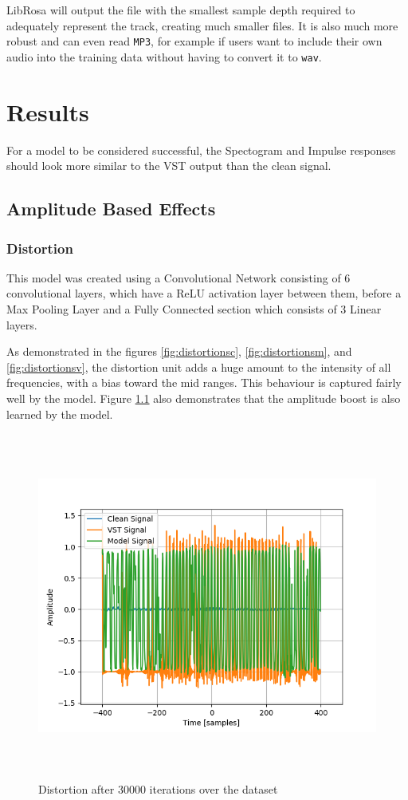 \documentclass{l4proj}
\begin{document}
LibRosa will output the file with the smallest sample depth required to
adequately represent the track, creating much smaller files. It is also
much more robust and can even read \texttt{MP3}, for example if users
want to include their own audio into the training data without having to
convert it to \texttt{wav}.

\chapter{Results}\label{results}

For a model to be considered successful, the Spectogram and Impulse
responses should look more similar to the VST output than the clean
signal.

\section{Amplitude Based Effects}\label{amplitude-based-effects}

\subsection{Distortion}\label{distortion}

This model was created using a Convolutional Network consisting of 6
convolutional layers, which have a ReLU activation layer between them,
before a Max Pooling Layer and a Fully Connected section which consists
of 3 Linear layers.

As demonstrated in the figures \ref{fig:distortionsc},
\ref{fig:distortionsm}, and \ref{fig:distortionsv}, the distortion unit
adds a huge amount to the intensity of all frequencies, with a bias
toward the mid ranges. This behaviour is captured fairly well by the
model. Figure \ref{fig:distortion} also demonstrates that the amplitude
boost is also learned by the model.

\begin{figure}
\centering
\includegraphics[width=6.00000in,height=4.50000in]{images/distortion.png}
\caption{Distortion after 30000 iterations over the
dataset\label{fig:distortion}}
\end{figure}
\end{document}
